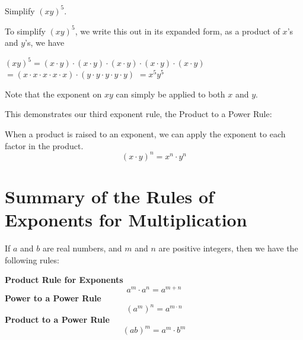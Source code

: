 \documentclass{ximera}
\begin{document}
 \begin{example}   
          Simplify $(xy)^5$.
    
          To simplify $(xy)^5$,
          we write this out in its expanded form,
          as a product of $x$'s and $y$'s, we have

            $(xy)^5 =(x \cdot y) \cdot (x \cdot y) \cdot (x \cdot y) \cdot (x \cdot y) \cdot (x \cdot y)$
            $=(x \cdot x \cdot x \cdot x \cdot x) \cdot (y \cdot y \cdot y \cdot y \cdot y)$
            $=x^5 y^5$

          Note that the exponent on $xy$ can simply be applied to both $x$ and $y$.
\end{example}


      This demonstrates our third exponent rule,
      the Product to a Power Rule:
\begin{theorem}
      When a product is raised to an exponent,
      we can apply the exponent to each factor in the product.
$$
        \left(x\cdot y\right)^n = x^{n}\cdot y^{n}
 $$
\end{theorem}


      \section{Summary of the Rules of Exponents for Multiplication}
  

\begin{summary}
          If $a$ and $b$ are real numbers,
          and $m$ and $n$ are positive integers,
          then we have the following rules:
 
\textbf{Product Rule for Exponents}
$$
            a^{m} \cdot a^{n} = a^{m+n}
$$
\textbf{Power to a Power Rule}
   $$
           (a^{m})^{n} = a^{m\cdot n}
   $$
 \textbf{Product to a Power Rule}
   $$
           (ab)^{m} = a^{m} \cdot b^{m}
   $$  
\end{summary}
\end{document}
